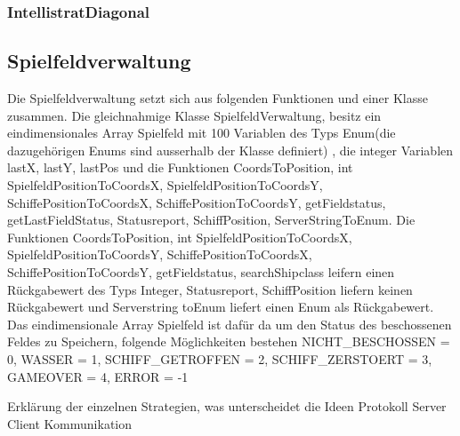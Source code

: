 \subsubsection*{IntellistratDiagonal}

\subsection*{Spielfeldverwaltung}

Die Spielfeldverwaltung setzt sich aus folgenden Funktionen und einer Klasse zusammen.
Die gleichnahmige Klasse SpielfeldVerwaltung, besitz ein eindimensionales Array Spielfeld mit 100 Variablen des Typs Enum(die dazugehörigen Enums sind ausserhalb der Klasse definiert)
, die integer Variablen lastX, lastY, lastPos und die Funktionen CoordsToPosition, int SpielfeldPositionToCoordsX, SpielfeldPositionToCoordsY, SchiffePositionToCoordsX, 
SchiffePositionToCoordsY, getFieldstatus, getLastFieldStatus, Statusreport, SchiffPosition, ServerStringToEnum. Die Funktionen CoordsToPosition, int SpielfeldPositionToCoordsX, 
SpielfeldPositionToCoordsY, SchiffePositionToCoordsX, SchiffePositionToCoordsY, getFieldstatus, searchShipclass leifern einen Rückgabewert des Typs Integer, Statusreport, 
SchiffPosition liefern keinen Rückgabewert und Serverstring toEnum liefert einen Enum als Rückgabewert. Das eindimensionale Array Spielfeld ist dafür da um den Status des 
beschossenen Feldes zu Speichern, folgende Möglichkeiten bestehen NICHT\_BESCHOSSEN = 0, WASSER = 1, SCHIFF\_GETROFFEN = 2, SCHIFF\_ZERSTOERT = 3, GAMEOVER = 4, ERROR = -1


Erklärung der einzelnen Strategien, was unterscheidet die Ideen
Protokoll Server Client Kommunikation